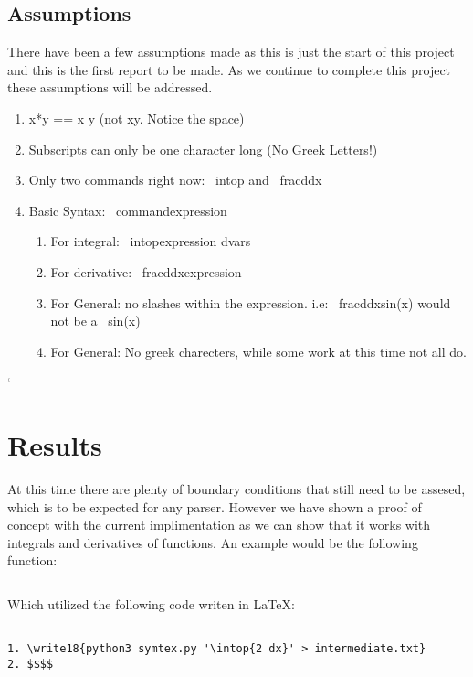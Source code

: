 \documentclass[english]{article}
\begin{document}
\subsection{Assumptions}

There have been a few assumptions made as this is just the start of this project and this is the first report to be made. As we continue to complete this project these assumptions will be addressed.

\begin{enumerate}
  \item {x*y == x y (not xy. Notice the space)}
  \item {Subscripts can only be one character long (No Greek Letters!)}
  \item {Only two commands right now: \ intop and \ frac{d}{dx}}
  \item {Basic Syntax: \ command{expression}}
  \begin{enumerate}
    \item {For integral: \ intop{expression dvars}}
    \item {For derivative: \ frac{d}{dx}{expression}}
    \item {For General: no slashes within the expression. i.e: \ frac{d}{dx}{sin(x)} would not be a \ sin(x)}
    \item {For General: No greek charecters, while some work at this time not all do.}
  \end{enumerate}
\end{enumerate}`

\section{Results}

At this time there are plenty of boundary conditions that still need to be assesed, which is to be expected for any parser. However we have shown a proof of concept with the current implimentation as we can show that it works with integrals and derivatives of functions. An example would be the following function:

$$$$

Which utilized the following code writen in \LaTeX:

\begin{lstlisting}

1. \write18{python3 symtex.py '\intop{2 dx}' > intermediate.txt}
2. $$$$

\end{lstlisting}
\end{document}
